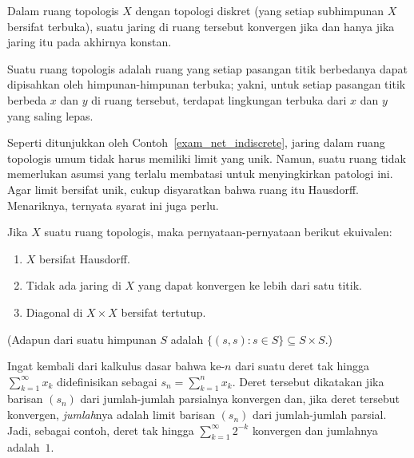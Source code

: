 \begin{exam} Dalam ruang topologis $X$ dengan topologi diskret (yang setiap subhimpunan $X$ bersifat terbuka), suatu jaring
di ruang tersebut konvergen jika dan hanya jika jaring itu pada akhirnya konstan.
 \end{exam}

\begin{defn} Suatu ruang topologis
 adalah ruang yang setiap pasangan titik berbedanya dapat
dipisahkan oleh himpunan-himpunan terbuka; yakni, untuk setiap pasangan titik berbeda $x$ dan $y$ di ruang tersebut, terdapat
lingkungan terbuka dari $x$ dan $y$ yang saling lepas.
\end{defn}

Seperti ditunjukkan oleh Contoh~\ref{exam_net_indiscrete}, jaring dalam ruang topologis umum tidak harus memiliki
limit yang unik. Namun, suatu ruang tidak memerlukan asumsi yang terlalu membatasi untuk menyingkirkan
patologi ini. Agar limit bersifat unik, cukup disyaratkan bahwa ruang itu Hausdorff.
Menariknya, ternyata syarat ini juga perlu.

\begin{prop}\label{C031441} Jika $X$ suatu ruang topologis, maka pernyataan-pernyataan berikut ekuivalen:
 \begin{enumerate}
  \item $X$ bersifat Hausdorff.
  \item Tidak ada jaring di $X$ yang dapat konvergen ke lebih dari satu titik.
  \item Diagonal di $X \times X$ bersifat tertutup.
 \end{enumerate}
\end{prop}
(Adapun
 dari suatu himpunan $S$ adalah $\{(s,s) \colon s \in S\} \subseteq S \times S$.)

\begin{exam} Ingat kembali dari kalkulus dasar bahwa
 $\text{ke-}n$ dari suatu deret tak hingga $\sum_{k=1}^\infty x_k$ didefinisikan sebagai $s_n =
\sum_{k=1}^n x_k$. Deret tersebut dikatakan
 jika barisan $(s_n)$ dari jumlah-jumlah parsialnya konvergen dan, jika deret tersebut
konvergen,
\emph{jumlah}nya adalah limit barisan $(s_n)$ dari jumlah-jumlah parsial. Jadi, sebagai contoh,
deret tak hingga $\sum_{k=1}^\infty 2^{-k}$ konvergen dan jumlahnya adalah~$1$.
\end{exam}

